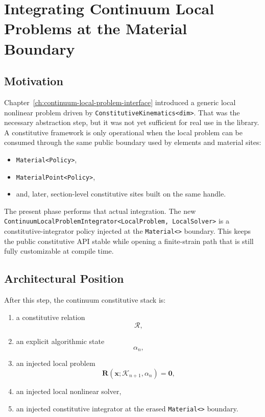 \chapter{Integrating Continuum Local Problems at the Material Boundary}
\label{ch:continuum-local-integrator-boundary}

\section{Motivation}

Chapter~\ref{ch:continuum-local-problem-interface} introduced a generic local
nonlinear problem driven by \texttt{ConstitutiveKinematics<dim>}. That was the
necessary abstraction step, but it was not yet sufficient for real use in the
library. A constitutive framework is only operational when the local problem
can be consumed through the same public boundary used by elements and material
sites:
\begin{itemize}
  \item \texttt{Material<Policy>},
  \item \texttt{MaterialPoint<Policy>},
  \item and, later, section-level constitutive sites built on the same handle.
\end{itemize}

The present phase performs that actual integration. The new
\texttt{ContinuumLocalProblemIntegrator<LocalProblem, LocalSolver>} is a
constitutive-integrator policy injected at the \texttt{Material<>} boundary.
This keeps the public constitutive API stable while opening a finite-strain
path that is still fully customizable at compile time.

\section{Architectural Position}

After this step, the continuum constitutive stack is:
\begin{enumerate}
  \item a constitutive relation
        \[
          \mathcal{R},
        \]
  \item an explicit algorithmic state
        \[
          \alpha_n,
        \]
  \item an injected local problem
        \[
          \mathbf{R}(\mathbf{x}; \mathcal{K}_{n+1}, \alpha_n) = \mathbf{0},
        \]
  \item an injected local nonlinear solver,
  \item an injected constitutive integrator at the erased
        \texttt{Material<>} boundary.
\end{enumerate}

